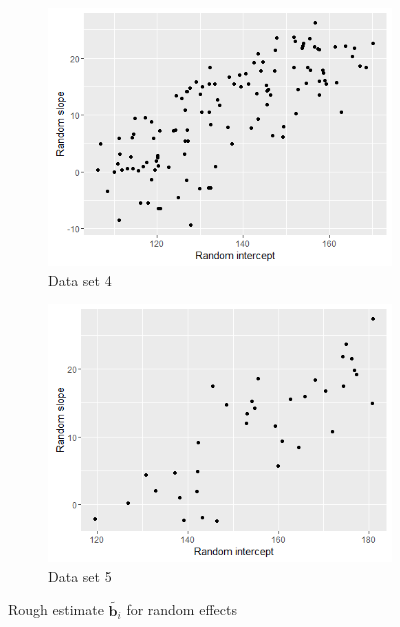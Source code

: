 \begin{figure}[!htb]
\centering
\captionsetup{justification=centering}
\begin{subfigure}[b]{0.4\textwidth}
		\includegraphics[width=\textwidth]{mainmatter/chapter_5_simulation_study/ds_3fused10ppg_randplot.png}
        \caption{\label{fig : ds_3fused10ppg_randplot}Data set 4}
	\end{subfigure}
	\begin{subfigure}[b]{0.4\textwidth}
		\includegraphics[width=\textwidth]{mainmatter/chapter_5_simulation_study/ds_3fused3ppg_randplot.png}
       \caption{\label{fig : ds_3fused3ppg_randplot}Data set 5}
	\end{subfigure}    
    
\caption{\label{fig : ds_3fused10ppg_3fused3ppg}Rough estimate $\tilde{\boldsymbol{b}_i}$ for random effects}
\end{figure}

